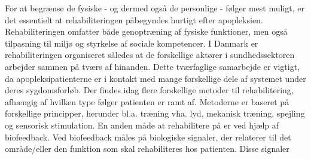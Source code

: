 For at begrænse de fysiske - og dermed også de personlige - følger mest muligt, er det essentielt at rehabiliteringen påbegyndes hurtigt efter apopleksien. Rehabiliteringen omfatter både genoptræning af fysiske funktioner, men også tilpasning til miljø og styrkelse af sociale kompetencer. 
I Danmark er rehabiliteringen organiseret således at de forskellige aktører i sundhedssektoren arbejder sammen på tværs af hinanden. Dette tværfaglige samarbejde er vigtigt, da apopleksipatienterne er i kontakt med mange forskellige dele af systemet under deres sygdomsforløb. 
Der findes idag flere forskellige metoder til rehabilitering, afhængig af hvilken type følger patienten er ramt af. Metoderne er baseret på forskellige principper, herunder bl.a. træning vha. lyd, mekanisk træning, spejling og sensorisk stimulation.
En anden måde at rehabilitere på er ved hjælp af biofeedback. Ved biofeedback måles på biologiske signaler, der relaterer til det område/eller den funktion som skal rehabiliteres hos patienten. Disse signaler      